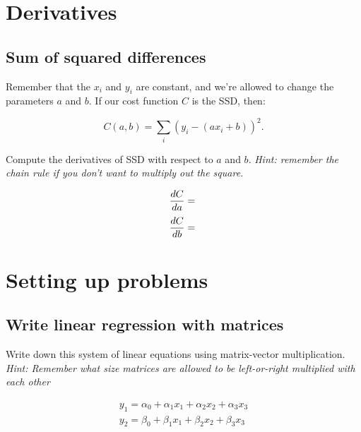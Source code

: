 \documentclass[11pt]{article}
\begin{document}
\section{ Derivatives }

\subsection{ Sum of squared differences }

Remember that the $x_i$ and $y_i$ are constant, and we're allowed to
change the parameters $a$ and $b$. If our cost function $C$ is the SSD,
then:

\begin{equation}
    C(a,b) = \sum_i (y_i - (ax_i + b))^2.
\end{equation}

Compute the derivatives of SSD with respect to $a$ and $b$.
\emph{ Hint: remember the chain rule if you don't want to multiply out
the square.}


\begin{equation}
        \frac{ dC }{ da } =  \\
\end{equation}
\begin{equation}
        \frac{ dC }{ db } =  \\
\end{equation}



\section{Setting up problems}

\subsection{Write linear regression with matrices}

Write down this system of linear equations using matrix-vector
multiplication.  \emph{ Hint: Remember what size matrices are allowed
to be left-or-right multiplied with each other}

\begin{equation}
    \begin{array}{l}
    y_1 = \alpha_0 + \alpha_1 x_1  + \alpha_2 x_2 + \alpha_3 x_3 \\
    y_2 = \beta_0 + \beta_1 x_1  + \beta_2 x_2 + \beta_3 x_3 \\
    \end{array}
\end{equation}
\end{document}
